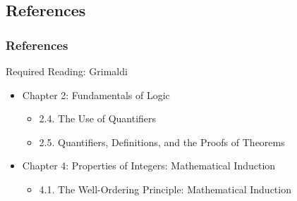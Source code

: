 \documentclass[dvipsnames]{beamer}
\begin{document}
%
%

\subsection*{References}

\begin{frame}
  \frametitle{References}

  \begin{block}{Required Reading: Grimaldi}
    \begin{itemize}
      \item Chapter 2: Fundamentals of Logic
      \begin{itemize}
        \item 2.4. \alert{The Use of Quantifiers}
        \item 2.5. \alert{Quantifiers, Definitions, and the Proofs of Theorems}
      \end{itemize}
      \item Chapter 4: Properties of Integers: Mathematical Induction
      \begin{itemize}
        \item 4.1. \alert{The Well-Ordering Principle: Mathematical Induction}
      \end{itemize}
    \end{itemize}
  \end{block}
\end{frame}
\end{document}
